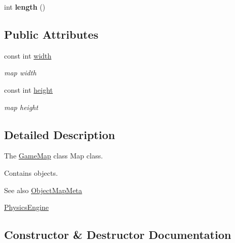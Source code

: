 \begin{DoxyCompactItemize}
\item 
\hypertarget{classGameMap_a0352e28044e91dd51dfa0d70a10e71ad}{}int {\bfseries length} ()\label{classGameMap_a0352e28044e91dd51dfa0d70a10e71ad}

\end{DoxyCompactItemize}
\subsection*{Public Attributes}
\begin{DoxyCompactItemize}
\item 
\hypertarget{classGameMap_ae9f5144c59e2749104bf8a47f1fd8eb3}{}const int \hyperlink{classGameMap_ae9f5144c59e2749104bf8a47f1fd8eb3}{width}\label{classGameMap_ae9f5144c59e2749104bf8a47f1fd8eb3}

\begin{DoxyCompactList}\small\item\em map width \end{DoxyCompactList}\item 
\hypertarget{classGameMap_a7d35b81d7d8e64820bfd2c9e5d8e708d}{}const int \hyperlink{classGameMap_a7d35b81d7d8e64820bfd2c9e5d8e708d}{height}\label{classGameMap_a7d35b81d7d8e64820bfd2c9e5d8e708d}

\begin{DoxyCompactList}\small\item\em map height \end{DoxyCompactList}\end{DoxyCompactItemize}


\subsection{Detailed Description}
The \hyperlink{classGameMap}{Game\+Map} class Map class. 

Contains objects.

\begin{DoxySeeAlso}{See also}
\hyperlink{classObjectMapMeta}{Object\+Map\+Meta} 

\hyperlink{classPhysicsEngine}{Physics\+Engine} 
\end{DoxySeeAlso}


\subsection{Constructor \& Destructor Documentation}
\hypertarget{classGameMap_a094aba2348a0265746326b6c1d1864f2}{}
